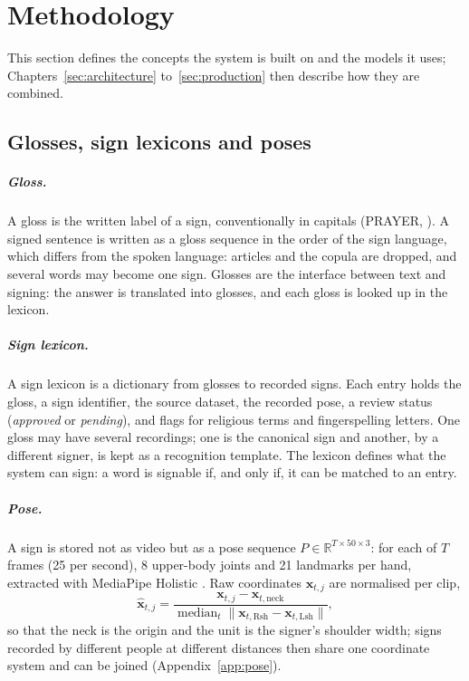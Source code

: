 \chapter{Methodology}
\label{sec:method}

This section defines the concepts the system is built on and the models it uses; Chapters~\ref{sec:architecture}
to~\ref{sec:production} then describe how they are combined.

\section{Glosses, sign lexicons and poses}
\paragraph{Gloss.} A gloss is the written label of a sign, conventionally in capitals (PRAYER, ). A signed
sentence is written as a gloss sequence in the order of the sign language, which differs from the spoken language:
articles and the copula are dropped, and several words may become one sign. Glosses are the interface between text and
signing: the answer is translated into glosses, and each gloss is looked up in the lexicon.

\paragraph{Sign lexicon.} A sign lexicon is a dictionary from glosses to recorded signs. Each entry holds the gloss, a
sign identifier, the source dataset, the recorded pose, a review status (\emph{approved} or \emph{pending}), and flags
for religious terms and fingerspelling letters. One gloss may have several recordings; one is the canonical sign and
another, by a different signer, is kept as a recognition template. The lexicon defines what the system can sign: a word
is signable if, and only if, it can be matched to an entry.

\paragraph{Pose.} A sign is stored not as video but as a pose sequence $P \in \mathbb{R}^{T\times 50\times 3}$: for each
of $T$ frames (25 per second), 8 upper-body joints and 21 landmarks per hand, extracted with MediaPipe Holistic
\cite{mediapipe,mediapipeholistic}. Raw coordinates $\mathbf{x}_{t,j}$ are normalised per clip,
\begin{equation}
\hat{\mathbf{x}}_{t,j} = \frac{\mathbf{x}_{t,j} - \mathbf{x}_{t,\mathrm{neck}}}{\operatorname{median}_t \lVert
\mathbf{x}_{t,\mathrm{Rsh}} - \mathbf{x}_{t,\mathrm{Lsh}} \rVert},
\end{equation}
so that the neck is the origin and the unit is the signer's shoulder width; signs recorded by different people at
different distances then share one coordinate system and can be joined (Appendix~\ref{app:pose}).


